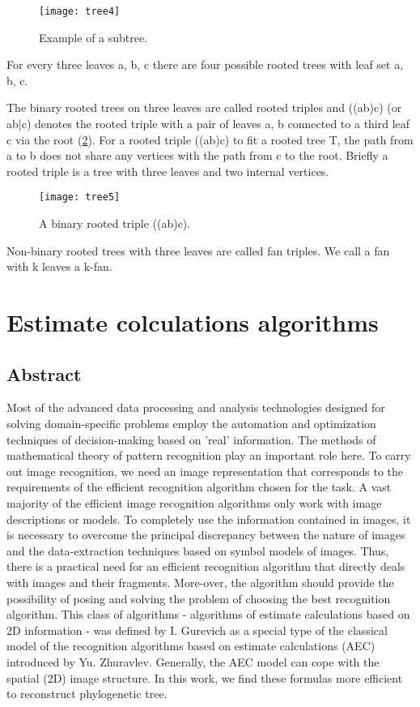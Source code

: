 \begin{figure}[!htbp] 
  \center
  \texttt{[image: tree4]}
  \caption[w]{Example of a subtree.} 
  \label{img:sample4}  
\end{figure} 

For every three leaves a, b, c there are four possible rooted trees 
with leaf set a, b, c.  

The binary rooted trees on three leaves are called rooted triples and 
((ab)c) (or ab|c) denotes the rooted triple with a pair of leaves a, b 
connected to a third leaf c via the root (\ref{img:sample5}). For a rooted triple 
((ab)c) to fit a rooted tree T, the path from a to b does not share any 
vertices with the path from c to the root. Briefly a rooted triple is a tree 
with three leaves and two internal vertices. 

\begin{figure}[!htbp] 
  \center
  \texttt{[image: tree5]}
  \caption[w]{ A binary rooted triple ((ab)c).} 
  \label{img:sample5}  
\end{figure} 

Non-binary rooted trees with three leaves are called fan triples. We 
call a fan with k leaves a k-fan. 


\section{Estimate colculations algorithms}
\subsection{Abstract} Most of the advanced data processing and analysis technologies 
designed for solving domain-specific problems employ the automation and 
optimization techniques of decision-making based on 'real' information. 
The methods of mathematical theory of pattern recognition play an important role here. 
To carry out image recognition, we need an image representation that 
corresponds to the requirements of the efficient recognition algorithm chosen 
for the task. A vast majority of the efficient image recognition algorithms 
only work with image descriptions or models. To completely use the information 
contained in images, it is necessary to overcome the principal discrepancy between 
the nature of images and the data-extraction techniques based on symbol models of 
images. Thus, there is a practical need for an efficient recognition algorithm that 
directly deals with images and their fragments. More-over, the algorithm should 
provide the possibility of posing and solving the problem of choosing the best
recognition algorithm. This class of algorithms - algorithms of estimate calculations 
based on 2D information - was defined by I. Gurevich as a special type of 
the classical model of the recognition algorithms based on estimate calculations 
(AEC) introduced by Yu. Zhuravlev. Generally, the AEC model can cope with the spatial 
(2D) image structure. In this work, we find these formulas more efficient to reconstruct
phylogenetic tree.

